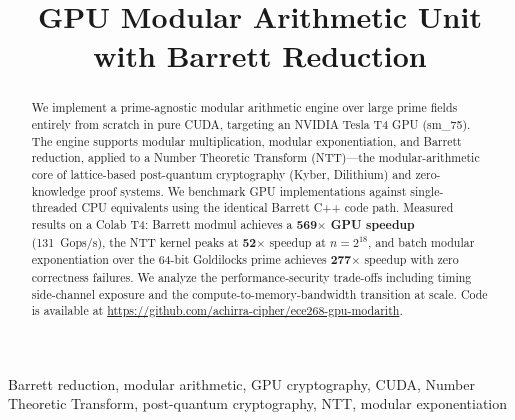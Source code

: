 \documentclass[conference]{IEEEtran}
\begin{document}
\title{GPU Modular Arithmetic Unit with Barrett Reduction}

\author{%
\and
{}
\and
{}
}

\maketitle

\begin{abstract}
We implement a prime-agnostic modular arithmetic engine over large prime fields
entirely from scratch in pure CUDA, targeting an NVIDIA Tesla T4 GPU (sm\_75).
The engine supports modular multiplication, modular exponentiation, and Barrett
reduction, applied to a Number Theoretic Transform (NTT)---the modular-arithmetic
core of lattice-based post-quantum cryptography (Kyber, Dilithium) and
zero-knowledge proof systems. We benchmark GPU implementations against
single-threaded CPU equivalents using the identical Barrett C++ code path.
Measured results on a Colab T4: Barrett modmul achieves a \textbf{569$\times$
GPU speedup} (131~Gops/s), the NTT kernel peaks at \textbf{52$\times$} speedup
at $n=2^{18}$, and batch modular exponentiation over the 64-bit Goldilocks prime
achieves \textbf{277$\times$} speedup with zero correctness failures. We analyze
the performance-security trade-offs including timing side-channel exposure and
the compute-to-memory-bandwidth transition at scale. Code is available at
\url{https://github.com/achirra-cipher/ece268-gpu-modarith}.
\end{abstract}

\begin{IEEEkeywords}
Barrett reduction, modular arithmetic, GPU cryptography, CUDA, Number Theoretic
Transform, post-quantum cryptography, NTT, modular exponentiation
\end{IEEEkeywords}
\end{document}
